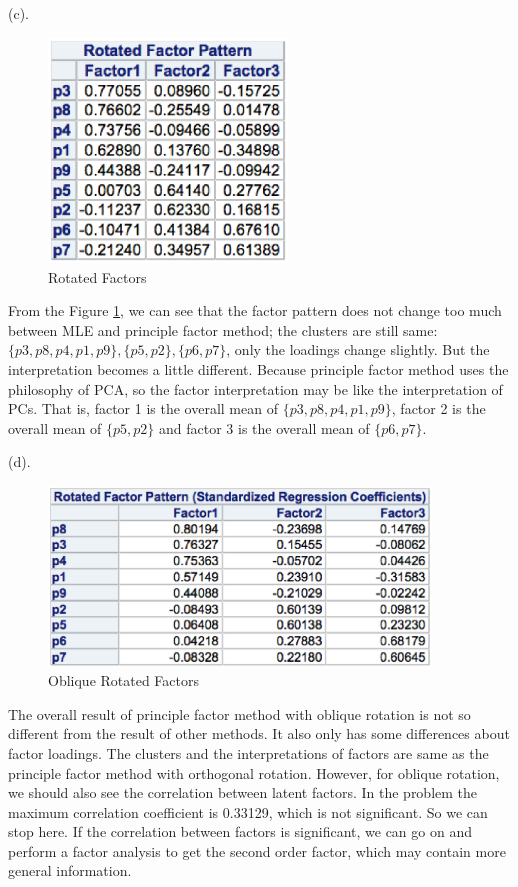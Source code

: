 \documentclass[letterpaper, 12pt]{article}
\begin{document}
(c). \begin{figure}[htbp]
\centering\includegraphics[width=2.5in]{7-9.eps}
\caption{Rotated Factors}\label{9}
\end{figure}
From the Figure \ref{9}, we can see that the factor pattern does not change too much between MLE and principle factor method; the clusters are still same: $\{p3,p8,p4,p1,p9\},\{p5,p2\},\{p6,p7\}$, only the loadings change slightly. But the interpretation becomes a little different. Because principle factor method uses the philosophy of PCA, so the factor interpretation may be like the interpretation of PCs. That is, factor 1 is the overall mean of $\{p3,p8,p4,p1,p9\}$, factor 2 is the overall mean of $\{p5,p2\}$ and factor 3 is the overall mean of $\{p6,p7\}$.


(d). \begin{figure}[htbp]
\centering\includegraphics[width=4in]{7-10.eps}
\caption{Oblique Rotated Factors}\label{10}
\end{figure}
The overall result of principle factor method with oblique rotation is not so different from the result of other methods. It also only has some differences about factor loadings. The clusters and the interpretations of factors are same as the principle factor method with orthogonal rotation. However, for oblique rotation, we should also see the correlation between latent factors. In the problem the maximum correlation coefficient is 0.33129, which is not significant. So we can stop here. If the correlation between factors is significant, we can go on and perform a factor analysis to get the second order factor, which may contain more general information.
\end{document}
